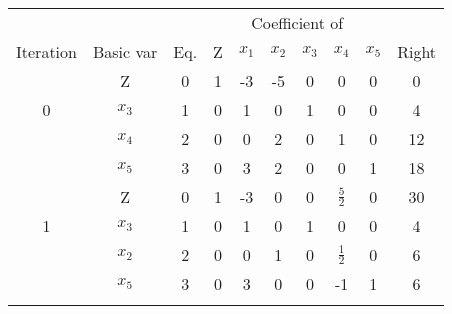 \documentclass[12pt]{article}
\newcommand{\thline}{ \noalign{\global\arrayrulewidth1pt}
 \hline
 \noalign{\global\arrayrulewidth0.4pt}}
\begin{document}
  \begin{tabular}{cc|c|c|ccccc|c} \hline 
    \multicolumn{2}{c|}{}  &           & \multicolumn{6}{|c|}{Coefficient of} &                                                                                                                          \\ 
    Iteration              & Basic var & Eq.                                  & Z & $x_1$                  & $x_2$                   & $x_3$ & $x_4$          & $x_5$          & Right                   \\ \hline 
                           & Z         & 0                                    & 1 & -3                     & -5                      & 0     & 0              & 0              & 0                       \\ \cline{6-6}
                         0 & $x_3$     & 1                                    & 0 & 1                      & \multicolumn{1}{|c|}{0} & 1     & 0              & 0              & 4                       \\ \cline{5-10}
                           & $x_4$     & 2                                    & 0 & 0                      & \multicolumn{1}{|c|}{2} & 0     & 1              & 0              & \multicolumn{1}{c|}{12} \\ \cline{5-10}
                           & $x_5$     & 3                                    & 0 & 3                      & \multicolumn{1}{|c|}{2} & 0     & 0              & 1              & 18                      \\ \thline 
                           & Z         & 0                                    & 1 & -3                     & 0                       & 0     & $\frac{5}{2}$  & 0              & 30                      \\ \cline{5-5}
                         1 & $x_3$     & 1                                    & 0 & \multicolumn{1}{c|}{1} & 0                       & 1     & 0              & 0              & 4                       \\ 
                           & $x_2$     & 2                                    & 0 & \multicolumn{1}{c|}{0} & 1                       & 0     & $\frac{1}{2}$  & 0              & 6                       \\ \cline{5-10}
                           & $x_5$     & 3                                    & 0 & \multicolumn{1}{c|}{3} & 0                       & 0     & -1             & 1              & \multicolumn{1}{c|}{6}  \\  \thline

\end{tabular}
\end{document}
